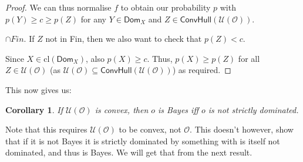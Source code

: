 \documentclass[a4paper]{article}
\newtheorem{corollary}[theorem]{Corollary}
\newcommand\cl{\mathrm{cl}}
\renewcommand\O{\mathcal{O}}
\newcommand\Uwald{\mathcal{U}} %
\newcommand{\Dom}{\mathsf{Dom}}
\newcommand{\todoold}[2][]{\todo[backgroundcolor=white,bordercolor=orange!10,linecolor=gray!10, #1,caption={},textcolor=gray]{Pre-rev: #2}}
\newcommand{\Conv}{\mathsf{ConvHull}}
\renewcommand{\geq}{\geqslant}
\newenvironment{CCM rewritten}
{\begingroup\color{blue}} %
{\endgroup}              %
\begin{document}
\begin{proof}
		
		We can thus normalise $f$ to obtain our probability $p$ with $p(Y)\geq c \geq p(Z)$ for any $Y\in \Dom_X $ and $Z\in \Conv(\Uwald(\O))$.\begin{infversion}
			$\cap Fin$. If $Z$ not in Fin, then we also want to check that $p(Z)<c$. 
		\end{infversion}
		
		Since $X\in\cl(\Dom_X )$, also $p(X)\geq c$. Thus, $p(X)\geq p(Z)$ for all $Z\in \Uwald(\O)$ (as $\Uwald(\O)\subseteq \Conv(\Uwald(\O))$) as required.
	\end{proof}
	
		This now gives us:
	\begin{corollary}
		If $\Uwald(\O)$ is convex, then 
		$o$ is Bayes iff $o$ is not strictly dominated.
	\end{corollary}
	Note that this requires $\Uwald(\O)$ to be convex, not $\O$. This doesn't however, show that if it is not Bayes it is strictly dominated by something with is itself not dominated, and thus is Bayes. We will get that from the next result. 
	
	
\end{document}

